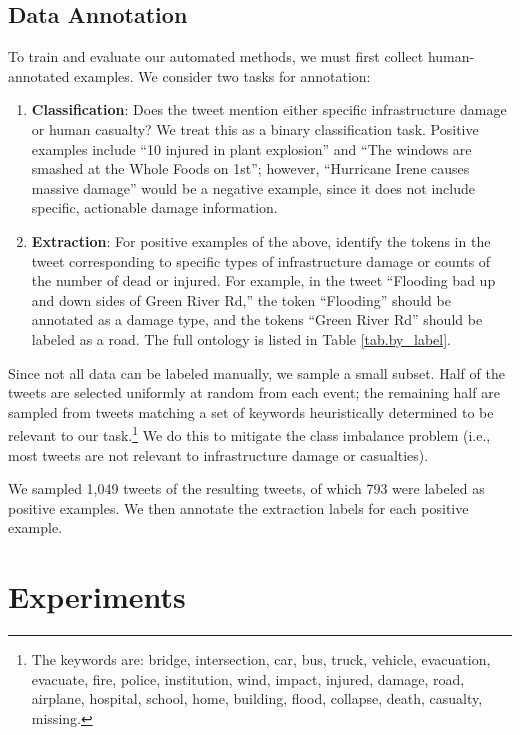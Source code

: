 \documentclass{article}
\begin{document}
\subsection{Data Annotation}
To train and evaluate our automated methods, we must first collect
human-annotated examples. We consider two tasks for annotation:
\begin{enumerate}
  \item {\bf Classification}: Does the tweet mention either specific
    infrastructure damage or human casualty? We treat this as a binary
    classification task. Positive examples include ``10 injured in plant
    explosion'' and ``The windows are smashed at the Whole Foods on 1st'';
    however, ``Hurricane Irene causes massive damage'' would be a negative
    example, since it does not include specific, actionable damage
    information.
  \item {\bf Extraction}: For positive examples of the above, identify the
    tokens in the tweet corresponding to specific types of infrastructure
    damage or counts of the number of dead or injured. For example, in the
    tweet ``Flooding bad up and down sides of Green River Rd,'' the token
    ``Flooding'' should be annotated as a damage type, and the tokens ``Green
    River Rd'' should be labeled as a road. The full ontology is listed in
    Table \ref{tab.by_label}.
\end{enumerate}

Since not all data can be labeled manually, we sample a small subset. Half of
the tweets are selected uniformly at random from each event; the remaining
half are sampled from tweets matching a set of keywords heuristically
determined to be relevant to our task.\footnote{The keywords are: bridge,
  intersection, car, bus, truck, vehicle, evacuation, evacuate, fire, police,
  institution, wind, impact, injured, damage, road, airplane, hospital,
  school, home, building, flood, collapse, death, casualty, missing.} We do
this to mitigate the class imbalance problem (i.e., most tweets are not
relevant to infrastructure damage or casualties).

We sampled 1,049 tweets of the resulting tweets, of which 793 were labeled as
positive examples. We then annotate the extraction labels for each positive
example.


\section{Experiments}
\end{document}
